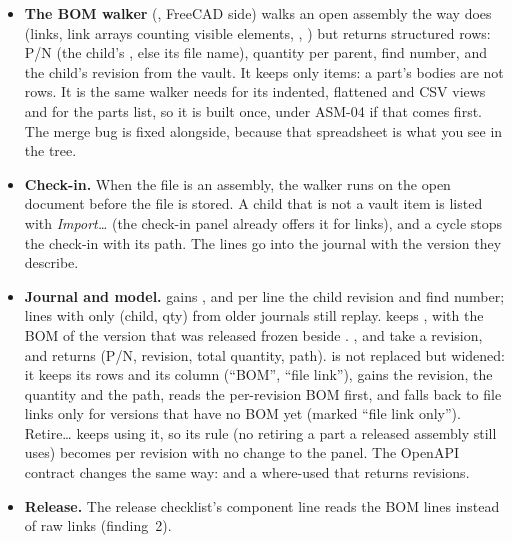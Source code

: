 \begin{itemize}[nosep]
  \item \textbf{The BOM walker} (, FreeCAD side) walks an open assembly the way
         does (links, link arrays counting visible elements, , ) but
        returns structured rows: P/N (the child's , else its file name), quantity per parent, find
        number, and the child's revision from the vault. It keeps only items: a part's bodies are not rows. It is the
        same walker  needs for its indented, flattened and CSV views and  for the parts list,
        so it is built once, under ASM-04 if that comes first. The  merge bug is fixed alongside, because
        that spreadsheet is what you see in the tree.
  \item \textbf{Check-in.} When the file is an assembly, the walker runs on the open document before the file is
        stored. A child that is not a vault item is listed with \emph{Import\ldots} (the check-in panel already offers it
        for links), and a cycle stops the check-in with its path. The lines go into the journal with the version they
        describe.
  \item \textbf{Journal and model.}  gains ,  and per line the child revision
        and find number; lines with only (child, qty) from older journals still replay.  keeps
        , with the BOM of the version that was released frozen beside
        . ,  and  take a revision, and
         returns (P/N, revision, total quantity, path).  is not replaced
        but widened: it keeps its rows and its  column (``BOM'', ``file link''), gains the revision, the
        quantity and the path, reads the per-revision BOM first, and falls back to file links only for versions that have
        no BOM yet (marked ``file link only''). Retire\ldots{} keeps using it, so its rule (no retiring a part a released
        assembly still uses) becomes per revision with no change to the panel. The OpenAPI contract changes the same way:
         and a where-used that returns revisions.
  \item \textbf{Release.} The release checklist's component line reads the BOM lines instead of raw links (finding~2).

\end{itemize}
